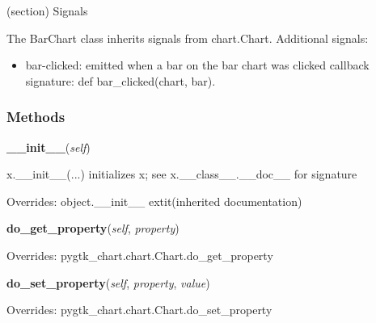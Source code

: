 (section) Signals

  The BarChart class inherits signals from chart.Chart. Additional signals:

  \begin{itemize}
  \setlength{\parskip}{0.6ex}
    \item bar-clicked: emitted when a bar on the bar chart was clicked callback
      signature: def bar\_clicked(chart, bar).

  \end{itemize}



  \subsubsection{Methods}

    \vspace{0.5ex}

\hspace{.8\funcindent}\begin{boxedminipage}{\funcwidth}

    \raggedright \textbf{\_\_init\_\_}(\textit{self})

\setlength{\parskip}{2ex}
    x.\_\_init\_\_(...) initializes x; see x.\_\_class\_\_.\_\_doc\_\_ for 
    signature

\setlength{\parskip}{1ex}
      Overrides: object.\_\_init\_\_ 	extit{(inherited documentation)}

    \end{boxedminipage}

    \vspace{0.5ex}

\hspace{.8\funcindent}\begin{boxedminipage}{\funcwidth}

    \raggedright \textbf{do\_get\_property}(\textit{self}, \textit{property})

\setlength{\parskip}{2ex}
\setlength{\parskip}{1ex}
      Overrides: pygtk\_chart.chart.Chart.do\_get\_property

    \end{boxedminipage}

    \vspace{0.5ex}

\hspace{.8\funcindent}\begin{boxedminipage}{\funcwidth}

    \raggedright \textbf{do\_set\_property}(\textit{self}, \textit{property}, \textit{value})

\setlength{\parskip}{2ex}
\setlength{\parskip}{1ex}
      Overrides: pygtk\_chart.chart.Chart.do\_set\_property

    \end{boxedminipage}

